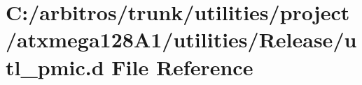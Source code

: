 \hypertarget{utilities_2project_2atxmega128_a1_2utilities_2_release_2utl__pmic_8d}{\section{C\-:/arbitros/trunk/utilities/project/atxmega128\-A1/utilities/\-Release/utl\-\_\-pmic.d File Reference}
\label{utilities_2project_2atxmega128_a1_2utilities_2_release_2utl__pmic_8d}
}
